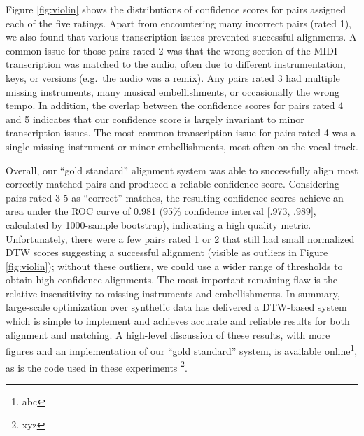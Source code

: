 \documentclass{article}
\begin{document}
Figure \ref{fig:violin} shows the distributions of confidence scores for pairs assigned each of the five ratings.
Apart from encountering many incorrect pairs (rated 1), we also found that various transcription issues prevented successful alignments.
A common issue for those pairs rated 2 was that the wrong section of the MIDI transcription was  matched to the audio, often due to different instrumentation, keys, or versions (e.g.\ the audio was a remix).
Any pairs rated 3 had multiple missing instruments, many musical embellishments, or occasionally the wrong tempo.
In addition, the overlap between the confidence scores for pairs rated 4 and 5 indicates that our confidence score is largely invariant to minor transcription issues.
The most common transcription issue for pairs rated 4 was a single missing instrument or minor embellishments, most often on the vocal track.

Overall, our ``gold standard'' alignment system was able to successfully align most correctly-matched pairs and produced a reliable confidence score.
Considering pairs rated 3-5 as ``correct'' matches, the resulting confidence scores achieve an area under the ROC curve of 0.981 (95\% confidence interval [.973, .989], calculated by 1000-sample bootstrap), indicating a high quality metric.
Unfortunately, there were a few pairs rated 1 or 2 that still had small normalized DTW scores suggesting a successful alignment (visible as outliers in Figure \ref{fig:violin}); without these outliers, we could use a wider range of thresholds to obtain high-confidence alignments.
The most important remaining flaw is the relative insensitivity to missing instruments and embellishments.
In summary, large-scale optimization over synthetic data has delivered a DTW-based system which is simple to implement and achieves accurate and reliable results for both alignment and matching.
A high-level discussion of these results, with more figures and an implementation of our ``gold standard'' system, is available online\footnote{abc}, as is the code used in these experiments \footnote{xyz}.



\end{document}
